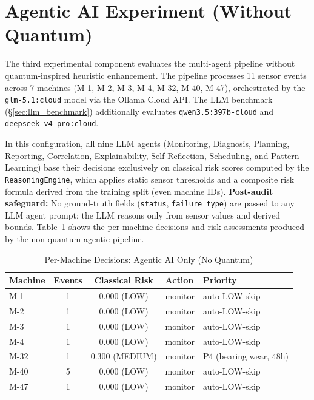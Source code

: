 \section{Agentic AI Experiment (Without Quantum)}

The third experimental component evaluates the multi-agent pipeline without quantum-inspired heuristic enhancement. The pipeline processes 11 sensor events across 7 machines (M-1, M-2, M-3, M-4, M-32, M-40, M-47), orchestrated by the \texttt{glm-5.1:cloud} model via the Ollama Cloud API. The LLM benchmark (\S\ref{sec:llm_benchmark}) additionally evaluates \texttt{qwen3.5:397b-cloud} and \texttt{deepseek-v4-pro:cloud}.

In this configuration, all nine LLM agents (Monitoring, Diagnosis, Planning, Reporting, Correlation, Explainability, Self-Reflection, Scheduling, and Pattern Learning) base their decisions exclusively on classical risk scores computed by the \texttt{ReasoningEngine}, which applies static sensor thresholds and a composite risk formula derived from the training split (even machine IDs). \textbf{Post-audit safeguard:} No ground-truth fields (\texttt{status}, \texttt{failure\_type}) are passed to any LLM agent prompt; the LLM reasons only from sensor values and derived bounds. Table~\ref{tab:agentic_decisions_nonquantum} shows the per-machine decisions and risk assessments produced by the non-quantum agentic pipeline.

\begin{table}[htbp]
\centering
\caption{Per-Machine Decisions: Agentic AI Only (No Quantum)}
\label{tab:agentic_decisions_nonquantum}
\begin{tabular}{lccll}
\hline
\textbf{Machine} & \textbf{Events} & \textbf{Classical Risk} & \textbf{Action} & \textbf{Priority} \\
\hline
M-1  & 1 & 0.000 (LOW)    & monitor & auto-LOW-skip \\
M-2  & 1 & 0.000 (LOW)    & monitor & auto-LOW-skip \\
M-3  & 1 & 0.000 (LOW)    & monitor & auto-LOW-skip \\
M-4  & 1 & 0.000 (LOW)    & monitor & auto-LOW-skip \\
M-32 & 1 & 0.300 (MEDIUM) & monitor & P4 (bearing wear, 48h) \\
M-40 & 5 & 0.000 (LOW)    & monitor & auto-LOW-skip \\
M-47 & 1 & 0.000 (LOW)    & monitor & auto-LOW-skip \\
\hline
\end{tabular}
\end{table}

